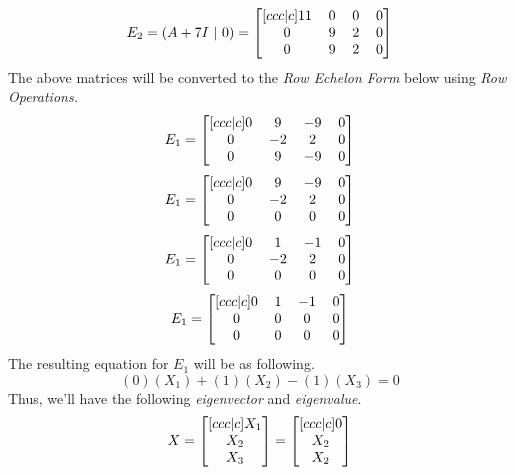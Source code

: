 \documentclass[12pt]{article}
\numberwithin{equation}{section}
\numberwithin{table}{section}
\numberwithin{figure}{section}
\begin{document}
\begin{equation}\label{eq:2.6}	
	E_2 = (A + 7I \ | \ 0) = 
	\renewcommand\arraystretch{1}
	\setlength\arraycolsep{6pt}
		\begin{bmatrix}[ccc|c]
		11 & 0 & 0 & 0\\	
		0 & 9 & 2 & 0\\
		0 & 9 & 2 & 0\\
		\end{bmatrix}
\end{equation}
The above matrices will be converted to the \textit{Row Echelon Form} below using \textit{Row Operations.}
$$
	E_1 = 
		\renewcommand\arraystretch{1}
		\setlength\arraycolsep{6pt}
		\begin{bmatrix}[ccc|c]
		0 & 9 & -9 & 0\\	
		0 & -2 & 2 & 0\\
		0 & 9 & -9 & 0\\
		\end{bmatrix}
$$
$$
	E_1 = 
		\renewcommand\arraystretch{1}
		\setlength\arraycolsep{6pt}
		\begin{bmatrix}[ccc|c]
		0 & 9 & -9 & 0\\	
		0 & -2 & 2 & 0\\
		0 & 0 & 0 & 0\\
		\end{bmatrix}
$$
$$
	E_1 = 
	\renewcommand\arraystretch{1}
	\setlength\arraycolsep{6pt}
	\begin{bmatrix}[ccc|c]
	0 & 1 & -1 & 0\\	
	0 & -2 & 2 & 0\\
	0 & 0 & 0 & 0\\
	\end{bmatrix}
$$
$$
E_1 = 
\renewcommand\arraystretch{1}
\setlength\arraycolsep{6pt}
\begin{bmatrix}[ccc|c]
0 & 1 & -1 & 0\\	
0 & 0 & 0 & 0\\
0 & 0 & 0 & 0\\
\end{bmatrix}
$$
The resulting equation for $E_1$ will be as following.
$$
	(0)(X_1) + (1)(X_2) - (1)(X_3) = 0
$$
Thus, we'll have the following \textit{eigenvector} and \textit{eigenvalue}.
$$
	X = 
		\renewcommand\arraystretch{1}
		\setlength\arraycolsep{6pt}
		\begin{bmatrix}[ccc|c]
		X_1\\	
		X_2\\
		X_3\\
		\end{bmatrix} = \renewcommand\arraystretch{1}
		\setlength\arraycolsep{6pt}
		\begin{bmatrix}[ccc|c]
		0\\	
		X_2\\
		X_2\\
		\end{bmatrix}
$$
\end{document}
